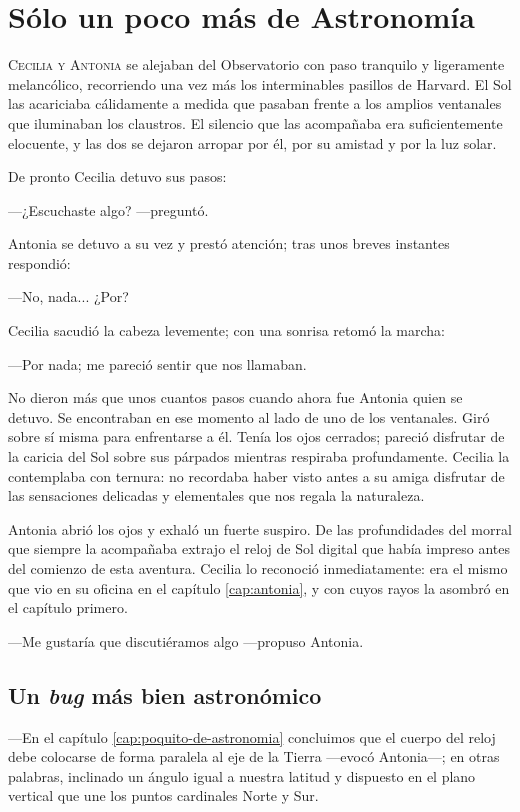 \chapter{Sólo un poco más de Astronomía}

\lettrine[lines=2]{C}{ecilia y Antonia} se alejaban del Observatorio
con paso tranquilo y ligeramente melancólico, recorriendo una vez más
los interminables pasillos de Harvard. El Sol las acariciaba
cálidamente a medida que pasaban frente a los amplios ventanales que
iluminaban los claustros. El silencio que las acompañaba era
suficientemente elocuente, y las dos se dejaron arropar por él, por su
amistad y por la luz solar.

De pronto Cecilia detuvo sus pasos:

---¿Escuchaste algo?  ---pre\-gun\-tó.

Antonia se detuvo a su vez y prestó atención; tras unos breves
instantes respondió:

---No, nada... ¿Por?

Cecilia sacudió la cabeza levemente; con una sonrisa retomó la marcha:

---Por nada; me pareció sentir que nos llamaban.

No dieron más que unos cuantos pasos cuando ahora fue Antonia quien se
detuvo. Se encontraban en ese momento al lado de uno de los
ventanales. Giró sobre sí misma para enfrentarse a él. Tenía los ojos
cerrados; pareció disfrutar de la caricia del Sol sobre sus párpados
mientras respiraba profundamente. Cecilia la contemplaba con ternura:
no recordaba haber visto antes a su amiga disfrutar de las sensaciones
delicadas y elementales que nos regala la naturaleza.

Antonia abrió los ojos y exhaló un fuerte suspiro. De las
profundidades del morral que siempre la acompañaba extrajo el reloj de
Sol digital que había impreso antes del comienzo de esta aventura.
Cecilia lo reconoció inmediatamente: era el mismo que vio en su
oficina en el capítulo \ref{cap:antonia}, y con cuyos rayos la asombró
en el capítulo primero.

---Me gustaría que discutiéramos algo ---propuso Antonia.

\section{Un \emph{bug} más bien astronómico}


---En el capítulo \ref{cap:poquito-de-astronomia} concluimos que el
cuerpo del reloj debe colocarse de forma paralela al eje de la Tierra
---e\-vo\-có Antonia---; en otras palabras, inclinado un ángulo igual a
nuestra latitud y dispuesto en el plano vertical que une los puntos
cardinales Norte y Sur.


